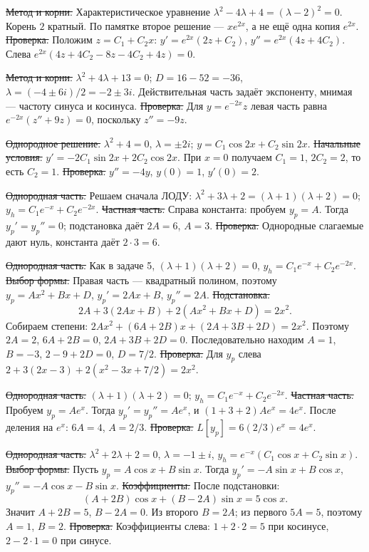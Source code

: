 \st{Метод и корни.} Характеристическое уравнение
$\lambda^2-4\lambda+4=(\lambda-2)^2=0$. Корень $2$ кратный.
По памятке второе решение --- $xe^{2x}$, а не ещё одна копия $e^{2x}$.
\st{Проверка.} Положим $z=C_1+C_2x$:
$y'=e^{2x}(2z+C_2)$, $y''=e^{2x}(4z+4C_2)$.
Слева $e^{2x}(4z+4C_2-8z-4C_2+4z)=0$.

\st{Метод и корни.} $\lambda^2+4\lambda+13=0$;
$D=16-52=-36$, $\lambda=(-4\pm6i)/2=-2\pm3i$.
Действительная часть задаёт экспоненту, мнимая --- частоту синуса и косинуса.
\st{Проверка.} Для $y=e^{-2x}z$ левая часть равна
$e^{-2x}(z''+9z)=0$, поскольку $z''=-9z$.

\st{Однородное решение.} $\lambda^2+4=0$, $\lambda=\pm2i$;
$y=C_1\cos2x+C_2\sin2x$.
\st{Начальные условия.} $y'=-2C_1\sin2x+2C_2\cos2x$.
При $x=0$ получаем $C_1=1$, $2C_2=2$, то есть $C_2=1$.
\st{Проверка.} $y''=-4y$, $y(0)=1$, $y'(0)=2$.

\st{Однородная часть.} Решаем сначала ЛОДУ:
$\lambda^2+3\lambda+2=(\lambda+1)(\lambda+2)=0$;
$y_h=C_1e^{-x}+C_2e^{-2x}$.
\st{Частная часть.} Справа константа: пробуем $y_p=A$.
Тогда $y_p'=y_p''=0$; подстановка даёт $2A=6$, $A=3$.
\st{Проверка.} Однородные слагаемые дают нуль, константа даёт $2\cdot3=6$.

\st{Однородная часть.} Как в задаче 5,
$(\lambda+1)(\lambda+2)=0$, $y_h=C_1e^{-x}+C_2e^{-2x}$.
\st{Выбор формы.} Правая часть --- квадратный полином, поэтому
$y_p=Ax^2+Bx+D$, $y_p'=2Ax+B$, $y_p''=2A$.
\st{Подстановка.}
$$2A+3(2Ax+B)+2(Ax^2+Bx+D)=2x^2.$$
Собираем степени: $2Ax^2+(6A+2B)x+(2A+3B+2D)=2x^2$.
Поэтому $2A=2$, $6A+2B=0$, $2A+3B+2D=0$.
Последовательно находим $A=1$, $B=-3$, $2-9+2D=0$, $D=7/2$.
\st{Проверка.} Для $y_p$ слева
$2+3(2x-3)+2(x^2-3x+7/2)=2x^2$.

\st{Однородная часть.} $(\lambda+1)(\lambda+2)=0$;
$y_h=C_1e^{-x}+C_2e^{-2x}$.
\st{Частная часть.} Пробуем $y_p=Ae^x$. Тогда $y_p'=y_p''=Ae^x$,
и $(1+3+2)Ae^x=4e^x$. После деления на $e^x$:
$6A=4$, $A=2/3$.
\st{Проверка.} $L[y_p]=6(2/3)e^x=4e^x$.

\st{Однородная часть.} $\lambda^2+2\lambda+2=0$,
$\lambda=-1\pm i$, $y_h=e^{-x}(C_1\cos x+C_2\sin x)$.
\st{Выбор формы.} Пусть $y_p=A\cos x+B\sin x$.
Тогда $y_p'=-A\sin x+B\cos x$, $y_p''=-A\cos x-B\sin x$.
\st{Коэффициенты.} После подстановки:
$$(A+2B)\cos x+(B-2A)\sin x=5\cos x.$$
Значит $A+2B=5$, $B-2A=0$. Из второго $B=2A$;
из первого $5A=5$, поэтому $A=1$, $B=2$.
\st{Проверка.} Коэффициенты слева: $1+2\cdot2=5$ при косинусе,
$2-2\cdot1=0$ при синусе.

